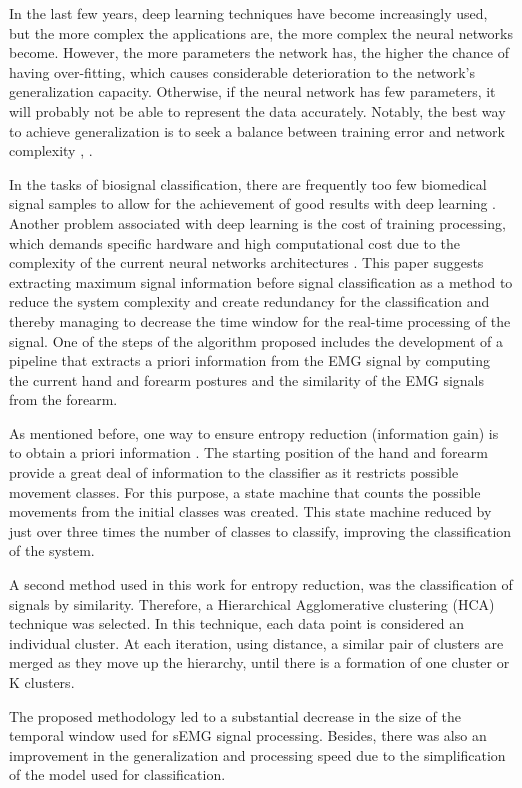 \documentclass[letterpaper, 10 pt, conference]{ieeeconf}  %
\begin{document}
In the last few years, deep learning techniques have become increasingly used, but the more complex the applications are, the more complex the neural networks become. However, the more parameters the network has, the higher the chance of having over-fitting, which causes considerable deterioration to the network’s generalization capacity. Otherwise, if the neural network has few parameters, it will
probably not be able to represent the data accurately. Notably, the best way to achieve generalization is to seek a balance between training error and network complexity \cite{c1}, \cite{c2}.

In the tasks of biosignal classification, there are frequently too few biomedical signal samples to allow for the achievement of good results with deep learning \cite{c3}. Another problem associated with deep learning is the cost of training processing, which demands specific hardware and high computational cost due to the complexity of the current neural networks architectures \cite{c4}. This paper suggests extracting maximum signal information before signal classification as a method to reduce the system complexity and create redundancy for the classification and thereby managing to decrease the time window for the real-time processing of the signal. One of the steps of the algorithm proposed includes the development of a pipeline that extracts a priori information from the EMG signal by computing the current hand and forearm postures and the similarity of the EMG signals from the forearm.

As mentioned before, one way to ensure entropy reduction (information gain) is to obtain a priori information \cite{c5}. The starting position of the hand and forearm provide a great deal of information to the classifier as it restricts possible movement classes. For this purpose, a state machine \cite{c6} that counts the possible movements from the initial classes was created. This state machine reduced by just over three times the number of classes to classify, improving the classification of the system.

A second method used in this work for entropy reduction, was the classification of signals by similarity. Therefore, a Hierarchical Agglomerative clustering (HCA) technique was selected. In this technique, each data point is considered an individual cluster. At each iteration, using distance, a similar pair of clusters are merged as they move up the hierarchy, until there is a formation of one cluster or K clusters.

The proposed methodology led to a substantial decrease in the size of the temporal window used for sEMG signal processing. Besides, there was also an improvement in the generalization and processing speed due to the simplification of the model used for classification.
\end{document}
